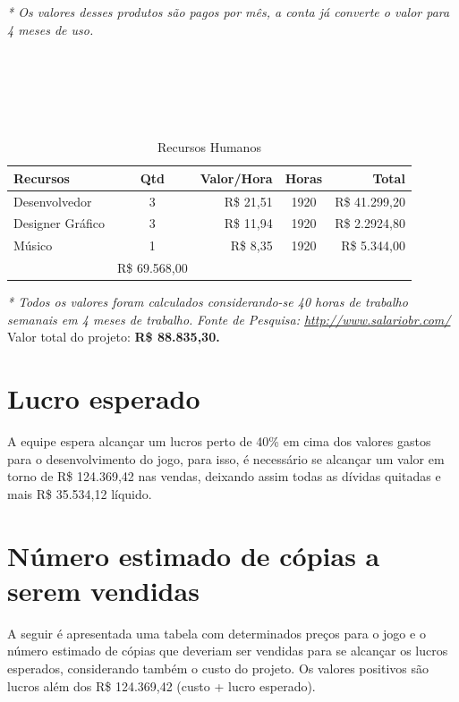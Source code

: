 \documentclass[a4paper,11pt]{article}
\begin{document}
\textit{* Os valores desses produtos são pagos por mês, a conta já converte o valor para 4 meses de uso.}
\\
\\
\\
\\
\\
\\

\begin{table}[h]
\centering
\begin{tabular}{lcrcr}
\toprule
\textbf{Recursos} & \textbf{Qtd} & \textbf{Valor/Hora} & \textbf{Horas} &
\textbf{Total} \\
\midrule
Desenvolvedor & 3 & R\$ 21,51 & 1920 & R\$ 41.299,20 \\
\rowcolor[gray]{0.9}
Designer Gráfico & 3 & R\$ 11,94 & 1920 & R\$ 2.2924,80 \\
Músico & 1 & R\$ 8,35 & 1920 & R\$ 5.344,00\\
\midrule
\rowcolor[gray]{0.7}
\multicolumn{4}{r}{\textbf{Total}} & R\$ 69.568,00\\
\bottomrule
\end{tabular}
\caption {Recursos Humanos}
\end{table}

\textit{* Todos os valores foram calculados considerando-se 40 horas de trabalho semanais em 4 meses de trabalho.}
\textit{Fonte de Pesquisa: \url{http://www.salariobr.com/}}
\\

Valor total do projeto: {\textbf{R\$ 88.835,30.}}

\section{Lucro esperado}

A equipe espera alcançar um lucros perto de 40\% em cima dos valores gastos para o desenvolvimento do jogo, para isso, é necessário se alcançar um valor em torno de R\$ 124.369,42 nas vendas, deixando assim todas as dívidas quitadas e mais R\$ 35.534,12 líquido.

\section{Número estimado de cópias a serem vendidas}

A seguir é apresentada uma tabela com determinados preços para o jogo e o número estimado de cópias que deveriam ser vendidas para se alcançar os lucros esperados, considerando também o custo do projeto. Os valores positivos são lucros além dos R\$ 124.369,42 (custo + lucro esperado). 
\end{document}

